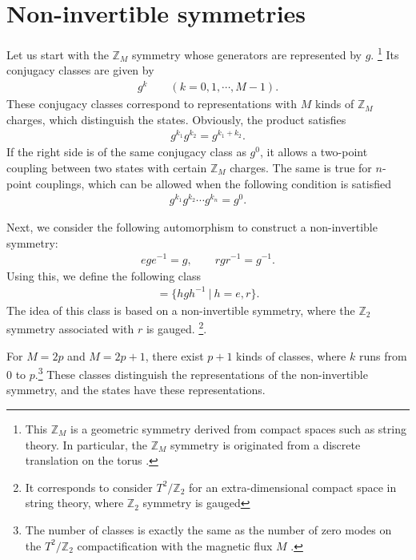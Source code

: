 \documentclass[a4paper,11pt]{article}
\numberwithin{equation}{section}
\begin{document}
\section{Non-invertible symmetries}
\label{sec:non-invertible}



Let us start with the $\mathbb{Z}_M$ symmetry whose generators are represented by $g$. \footnote{This $\mathbb{Z}_M$ is a geometric symmetry derived from compact spaces such as string theory. 
In particular, the $\mathbb{Z}_M$ symmetry is originated from a discrete translation on the torus \cite{Abe:2009vi,Berasaluce-Gonzalez:2012abm,Marchesano:2013ega}.}
Its conjugacy classes are given by 
\begin{align}
g^k\qquad (k=0,1,\cdots,M-1).
\end{align}
These conjugacy classes correspond to representations with $M$ kinds of $\mathbb{Z}_M$ charges, which distinguish the states.
Obviously, the product satisfies
\begin{align}
g^{k_1}g^{k_2}=g^{k_1+k_2}.
\end{align}
If the right side is of the same conjugacy class as $g^0$,
it allows a two-point coupling between two states with certain $\mathbb{Z}_M$ charges. 
The same is true for $n$-point couplings, which can be allowed when the following condition is satisfied
\begin{align}
g^{k_1}g^{k_2}\cdots g^{k_n}=g^0.
\end{align}


Next, we consider the following automorphism to construct a non-invertible symmetry:
\begin{align}
ege^{-1} = g, \qquad rgr^{-1}= g^{-1}.
\end{align}
Using this, we define the following class
\begin{align}
[g^k]=\{ hgh^{-1} ~|~ h=e,r \}.
\end{align}
The idea of this class is based on a non-invertible symmetry, 
where the $\mathbb{Z}_2$ symmetry associated with $r$ is gauged.  \footnote{It corresponds to consider $T^2/\mathbb{Z}_2$ for an extra-dimensional compact space in string theory, where $\mathbb{Z}_2$ symmetry is gauged}.


For $M=2p$ and $M=2p+1$, there exist $p+1$ kinds of classes, where $k$ runs from $0$ to $p$.\footnote{The number of classes is exactly the same as the number of zero modes on the $T^2/\mathbb{Z}_2$ compactification with the magnetic flux $M$ \cite{Abe:2008fi}.} 
These classes distinguish the representations of the non-invertible symmetry, and the states have these representations. 
\end{document}
